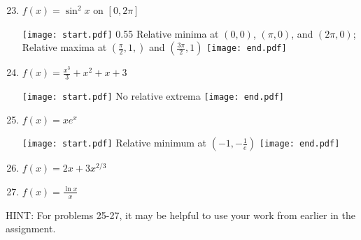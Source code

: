 \documentclass[12pt]{article}
\begin{document}

\begin{enumerate}
\setcounter{enumi}{22}

\item $f(x) = \sin^{2}{x} \text{ on } [0,2\pi]$ 

\texttt{[image: start.pdf]}
{{{0.55\linewidth}{
Relative minima at $(0,0)$, $(\pi,0)$, and $(2\pi,0)$;\\
Relative maxima at $\left(\frac{\pi}{2},1,\right)$ and $\left(\frac{3\pi}{2},1\right)$}}}
\texttt{[image: end.pdf]}


\item $f(x)=\frac{x^3}{3}+x^2+x+3$

\texttt{[image: start.pdf]}
{{No relative extrema}}
\texttt{[image: end.pdf]}


\item $f(x) = xe^x$  

\texttt{[image: start.pdf]}
{{Relative minimum at $\left(-1,-\frac{1}{e}\right)$}}
\texttt{[image: end.pdf]}


\item $f(x)=2x+3x^{2/3}$

\item $f(x)=\frac{\ln{x}}{x}$

\end{enumerate}

\noindent HINT: For problems 25-27, it may be helpful to use your work from earlier in the assignment.
\end{document}
